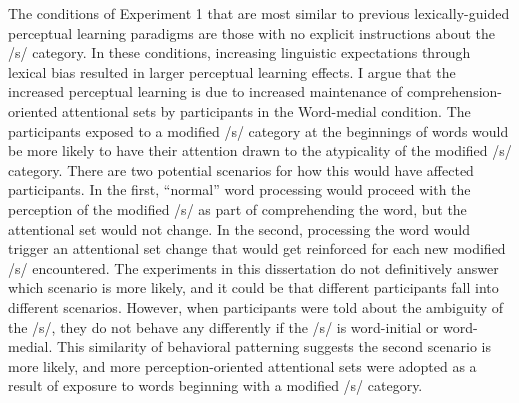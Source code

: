 The conditions of Experiment 1 that are most similar to previous lexically-guided perceptual learning paradigms are those with no explicit instructions about the /s/ category.
In these conditions, increasing linguistic expectations through lexical bias resulted in larger perceptual learning effects.
I argue that the increased perceptual learning is due to increased maintenance of comprehension-oriented attentional sets by participants in the Word-medial condition.
The participants exposed to a modified /s/ category at the beginnings of words would be more likely to have their attention drawn to the atypicality of the modified /s/ category.
There are two potential scenarios for how this would have affected participants.
In the first, ``normal'' word processing would proceed with the perception of the modified /s/ as part of comprehending the word, but the attentional set would not change.
In the second, processing the word would trigger an attentional set change that would get reinforced for each new modified /s/ encountered.
The experiments in this dissertation do not definitively answer which scenario is more likely, and it could be that different participants fall into different scenarios.
However, when participants were told about the ambiguity of the /s/, they do not behave any differently if the /s/ is word-initial or word-medial.
This similarity of behavioral patterning suggests the second scenario is more likely, and more perception-oriented attentional sets were adopted as a result of exposure to words beginning with a modified /s/ category.

